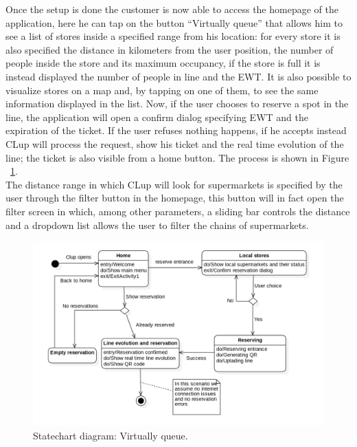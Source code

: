 Once the setup is done the customer is now able to access the homepage of the application, here he can tap on the button “Virtually queue” that allows him to see a list of stores inside a specified range from his location: for every store it is also specified the distance in kilometers from the user position, the number of people inside the store and its maximum occupancy, if the store is full it is instead displayed the number of people in line and the EWT.  It is also possible to visualize stores on a map and, by tapping on one of them, to see the same information displayed in the list. Now, if the user chooses to reserve a spot in the line, the application will open a confirm dialog specifying EWT and the expiration of the ticket. If the user refuses nothing happens, if he accepts instead CLup will process the request, show his ticket and the real time evolution of the line; the ticket is also visible from a home button. The process is shown in Figure ~\ref{fig:VirtuallyQ}.\\
The distance range in which CLup will look for supermarkets is specified by the user through the filter button in the homepage, this button will in fact open the filter screen in which, among other parameters, a sliding bar controls the distance and a dropdown list allows the user to filter the chains of supermarkets.\\

\begin{figure}
	\includegraphics[width=\linewidth]{../Diagrams/VirtuallyQueue.png}
	\caption{Statechart diagram: Virtually queue.}
	\label{fig:VirtuallyQ}
\end{figure}

